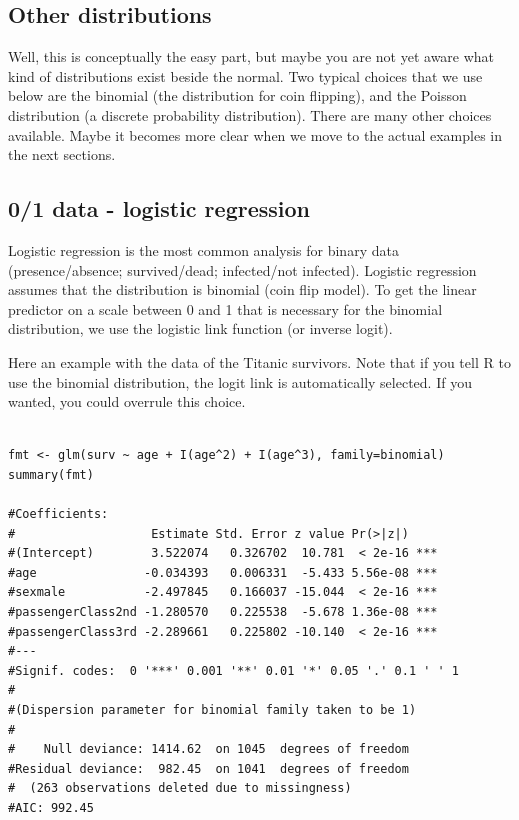 \documentclass[a4paper,twoside]{tufte-book} %
\begin{document}
\subsection{Other distributions}

Well, this is conceptually the easy part, but maybe you are not yet aware what kind of distributions exist beside the normal. Two typical choices that we use below are the binomial (the distribution for coin flipping), and the Poisson distribution (a discrete probability distribution). There are many other choices available. Maybe it becomes more clear when we move to the actual examples in the next sections. 

\subsection{0/1 data - logistic regression}

Logistic regression is the most common analysis for binary data (presence/absence; survived/dead; infected/not infected). Logistic regression assumes that the distribution is binomial (coin flip model). To get the linear predictor on a scale between 0 and 1 that is necessary for the binomial distribution, we use the logistic link function (or inverse logit). 

Here an example with the data of the Titanic survivors. Note that if you tell R to use the binomial distribution, the logit link is automatically selected. If you wanted, you could overrule this choice. 

\begin{lstlisting}

fmt <- glm(surv ~ age + I(age^2) + I(age^3), family=binomial)
summary(fmt)

#Coefficients:
#                   Estimate Std. Error z value Pr(>|z|)    
#(Intercept)        3.522074   0.326702  10.781  < 2e-16 ***
#age               -0.034393   0.006331  -5.433 5.56e-08 ***
#sexmale           -2.497845   0.166037 -15.044  < 2e-16 ***
#passengerClass2nd -1.280570   0.225538  -5.678 1.36e-08 ***
#passengerClass3rd -2.289661   0.225802 -10.140  < 2e-16 ***
#---
#Signif. codes:  0 '***' 0.001 '**' 0.01 '*' 0.05 '.' 0.1 ' ' 1
#
#(Dispersion parameter for binomial family taken to be 1)
#
#    Null deviance: 1414.62  on 1045  degrees of freedom
#Residual deviance:  982.45  on 1041  degrees of freedom
#  (263 observations deleted due to missingness)
#AIC: 992.45

\end{lstlisting}
\end{document}
